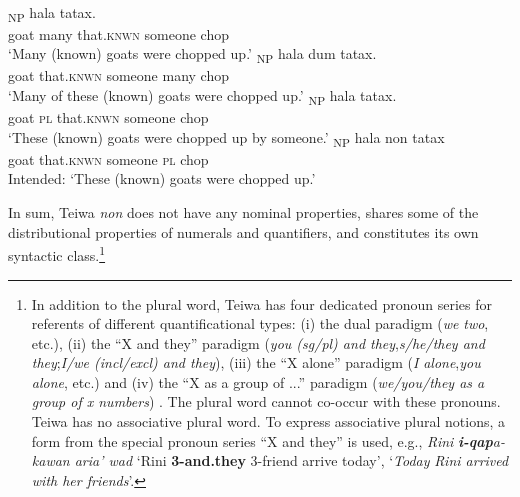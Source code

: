 \ea%
\label{ex:9:30}
 \\
\ea
{}\textsubscript{NP} hala tatax. \\
   goat many that.\textsc{knwn} someone chop  \\
 \glt `Many (known) goats were chopped up.'
\ex
{}\textsubscript{NP} hala dum tatax. \\
   goat that.\textsc{knwn} someone many chop  \\
\glt `Many of these (known) goats were chopped up.'
\ex
{}\textsubscript{NP} hala tatax. \\
   goat \textsc{pl} that.\textsc{knwn} someone chop  \\
\glt  `These (known) goats were chopped up by someone.'
\ex
{}\textsubscript{NP} hala non tatax \\
   goat that.\textsc{knwn} someone \textsc{pl} chop  \\
\glt  Intended: `These (known) goats were chopped up.'
\z
\z


In sum, Teiwa \textit{non} does not have any nominal properties, shares some of the distributional properties of numerals and quantifiers, and constitutes its own syntactic class.\footnote{  In addition to the plural word, Teiwa has four dedicated pronoun series for referents of different quantificational types: (i) the dual paradigm (\textit{we} \textit{two}, etc.), (ii) the ``X and they'' paradigm (\textit{you (sg/pl) and they},\textit{s/he/they and they};\textit{I/we (incl/excl) and they}), (iii) the ``X alone'' paradigm (\textit{I} \textit{alone},\textit{you} \textit{alone}, etc.) and (iv) the ``X as a group of ...'' paradigm (\textit{we/you/they as a group of x numbers}) \citep[82-85]{Klamer2010}. The plural word cannot co-occur with these pronouns. Teiwa has no associative plural word. To express associative plural notions, a form from the special pronoun series ``X and they'' is used, e.g., \textit{Rini } \textbf{\textit{i-qap}}\textit{a-kawan aria' wad } `Rini \textbf{3-and.they} 3-friend
arrive today',  `\textit{Today} \textit{Rini arrived with her friends}'.}

